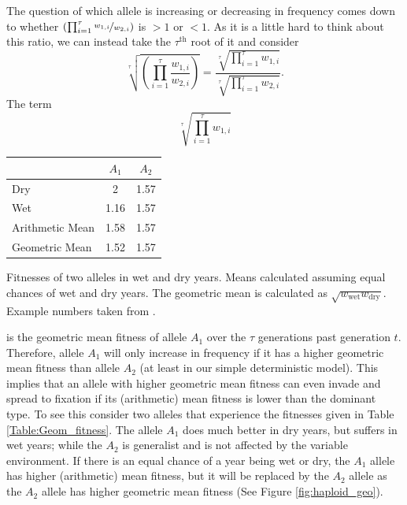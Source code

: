The question of which allele is increasing or decreasing in frequency comes down
to whether $\left(\prod_{i=1}^{\tau} \nicefrac{w_{1,i}}{w_{2,i}}  \right)$ is
$>1$ or $<1$. As it is a little hard to think about this ratio, we can
instead take the $\tau^{\mathrm{th}}$ root of it and consider
\begin{equation}
\sqrt[\tau]{\left(\prod_{i=1}^{\tau} \frac{w_{1,i}}{w_{2,i}}  \right)} = \frac{\sqrt[\tau]{\prod_{i=1}^{\tau}w_{1,i}}}{\sqrt[\tau]{\prod_{i=1}^{\tau}w_{2,i}}}.
\end{equation}
The term
\begin{equation}
  \sqrt[\tau]{\prod_{i=1}^{\tau}w_{1,i}}  \label{hap_geo_fitness}
\end{equation}
\begin{margintable}
  \begin{tabular}{lcc}
    & $A_1$  & $A_2$\\
    \hline
    Dry & 2 & 1.57 \\
    Wet &  1.16 & 1.57   \\
    \hline
    Arithmetic Mean & 1.58  & 1.57  \\
    Geometric Mean & 1.52 & 1.57 
  \end{tabular}
  \caption{Fitnesses of two alleles in wet and dry years. Means calculated assuming
    equal chances of wet and dry years. The geometric mean is
    calculated as
    $\sqrt{w_{\textrm{wet}}w_{\textrm{dry}}}$. Example numbers
    taken from \citet{seger1987oxford}.} \label{Table:Geom_fitness}
\end{margintable}

is the geometric mean fitness of allele
 $A_1$ over the $\tau$ generations past generation $t$. Therefore, allele $A_1$ will only increase
in frequency if it has a higher geometric mean fitness than allele $A_2$
(at least in our simple deterministic model). This implies that an allele with higher
geometric mean fitness can even invade and spread to fixation if its
(arithmetic) mean fitness is lower than the dominant type.  To see
this consider two alleles that experience the fitnesses given in Table
\ref{Table:Geom_fitness}. The allele $A_1$ does much better in
dry years, but suffers in wet years; while the $A_2$ is generalist and
is not affected by the variable environment. If there is an equal
chance of a year being wet or dry, the $A_1$ allele has
higher (arithmetic) mean fitness, but it will be replaced by the $A_2$
allele as the $A_2$ allele has higher geometric mean fitness (See Figure \ref{fig:haploid_geo}). \\

